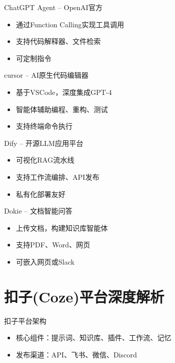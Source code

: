 \begin{frame}{ChatGPT Agent – OpenAI官方}
\begin{itemize}
    \item 通过Function Calling实现工具调用
    \item 支持代码解释器、文件检索
    \item 可定制指令
\end{itemize}
\end{frame}

\begin{frame}{cursor – AI原生代码编辑器}
\begin{itemize}
    \item 基于VSCode，深度集成GPT-4
    \item 智能体辅助编程、重构、测试
    \item 支持终端命令执行
\end{itemize}
\end{frame}

\begin{frame}{Dify – 开源LLM应用平台}
\begin{itemize}
    \item 可视化RAG流水线
    \item 支持工作流编排、API发布
    \item 私有化部署友好
\end{itemize}
\end{frame}

\begin{frame}{Dokie – 文档智能问答}
\begin{itemize}
    \item 上传文档，构建知识库智能体
    \item 支持PDF、Word、网页
    \item 可嵌入网页或Slack
\end{itemize}
\end{frame}

\section{扣子(Coze)平台深度解析}

\begin{frame}{扣子平台架构}
\begin{center}
\end{center}
\begin{itemize}
    \item 核心组件：提示词、知识库、插件、工作流、记忆
    \item 发布渠道：API、飞书、微信、Discord
\end{itemize}
\end{frame}

